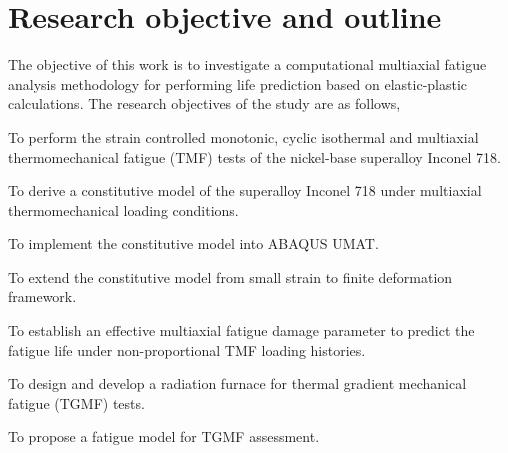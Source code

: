 %



\section{Research objective and outline}
\noindent
The objective of this work is to investigate a computational multiaxial fatigue analysis methodology for performing life prediction based on elastic-plastic calculations. The research objectives of the study are as follows,
\begin{list}{.}
  {
  \setlength{\rightmargin}{\leftmargin}}
    \item To perform the strain controlled monotonic, cyclic isothermal and multiaxial thermomechanical fatigue (TMF) tests of the nickel-base superalloy Inconel 718.
    \item To derive a constitutive model of the superalloy Inconel 718 under multiaxial thermomechanical loading conditions.
    \item To implement the constitutive model into ABAQUS UMAT.
    \item To extend the constitutive model from small strain to finite deformation framework.
    \item To establish an effective multiaxial fatigue damage parameter to predict the fatigue life under non-proportional TMF loading histories.
    \item To design and develop a radiation furnace for thermal gradient mechanical fatigue (TGMF) tests.
    \item To propose a fatigue model for TGMF assessment.
\end{list}

